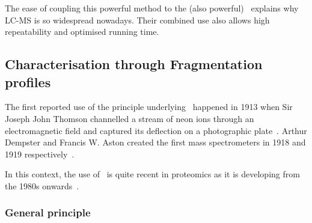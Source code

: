 \vspace{-0.5mm}
The ease of coupling this powerful method to the (also powerful) \ms\ explains
why \gls{LC-MS} is so widespread nowadays. Their combined use also allows high
repeatability and optimised running time.
\vspace{-1mm}

\subsection{Characterisation through Fragmentation profiles}
\vspace{-3mm}

The first reported use of the principle underlying \ms\ happened in 1913 when
Sir Joseph John Thomson channelled a stream of neon ions through an electromagnetic
field and captured its deflection on a photographic plate~.
Arthur Dempster and Francis W. Aston created the first mass spectrometers in 1918
and 1919 respectively~.
\begin{comment}
\ms\ became rapidly a pillar
of the so-called \emph{modern analytical techniques} in Chemistry as it allows
for a large spectrum of molecules of interest, the detection,
the characterisation and even, for the smaller ones, the resolution of their
structures.
\end{comment}
In this context, the use of \ms\ is quite recent in proteomics
as it is developing from the 1980s onwards~.

\subsubsection{General principle}

